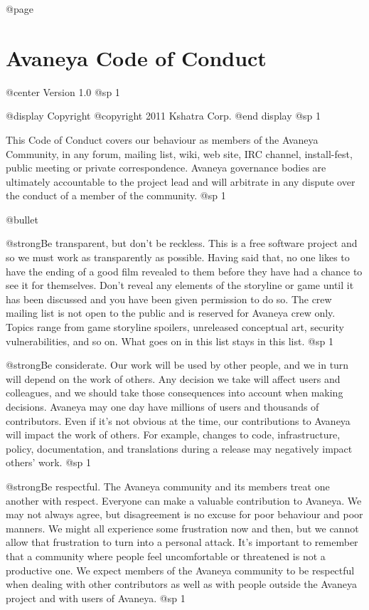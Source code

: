 @page
\section{Avaneya Code of Conduct}
@center Version 1.0
@sp 1


@display
Copyright @copyright{} 2011 Kshatra Corp.
@end display
@sp 1

This Code of Conduct covers our behaviour as members of the Avaneya
Community, in any forum, mailing list, wiki, web site, IRC channel,
install-fest, public meeting or private correspondence. Avaneya
governance bodies are ultimately accountable to the project lead and
will arbitrate in any dispute over the conduct of a member of the
community.
@sp 1

\itemize @bullet
\item
@strong{Be transparent, but don't be reckless.} This is a free
software project and so we must work as transparently as possible.
Having said that, no one likes to have the ending of a good film
revealed to them before they have had a chance to see it for
themselves. Don't reveal any elements of the storyline or game until
it has been discussed and you have been given permission to do so. The
crew mailing list is not open to the public and is reserved for
Avaneya crew only. Topics range from game storyline spoilers,
unreleased conceptual art, security vulnerabilities, and so on. What
goes on in this list stays in this list.
@sp 1

\item
@strong{Be considerate.} Our work will be used by other people, and we
in turn will depend on the work of others. Any decision we take will
affect users and colleagues, and we should take those consequences
into account when making decisions. Avaneya may one day have millions
of users and thousands of contributors. Even if it's not obvious at
the time, our contributions to Avaneya will impact the work of others.
For example, changes to code, infrastructure, policy, documentation,
and translations during a release may negatively impact others' work.
@sp 1

\item
@strong{Be respectful.} The Avaneya community and its members treat one
another with respect. Everyone can make a valuable contribution to
Avaneya. We may not always agree, but disagreement is no excuse for
poor behaviour and poor manners. We might all experience some
frustration now and then, but we cannot allow that frustration to turn
into a personal attack. It's important to remember that a community
where people feel uncomfortable or threatened is not a productive one.
We expect members of the Avaneya community to be respectful when
dealing with other contributors as well as with people outside the
Avaneya project and with users of Avaneya.
@sp 1

